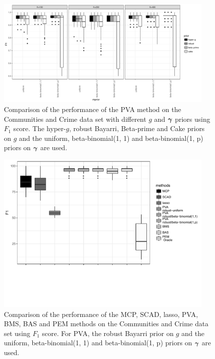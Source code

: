\begin{figure}
	\begin{center}	
		\includegraphics[width=0.95\textwidth]{./commPVA_F1.pdf}  
	\end{center}
	\caption{Comparison of the performance of the PVA method on the
						Communities and Crime data set with different $g$ and ${\boldsymbol \gamma}$ priors using $F_1$ score.
						The hyper-$g$,
						robust Bayarri, Beta-prime and Cake priors on $g$ and the uniform, beta-binomial(1, 1) and beta-binomial(1, p) priors on ${\boldsymbol \gamma}$ are used.}
	\label{fig:commPVA_F1}
\end{figure}

\begin{figure}
	\begin{center}	
		\includegraphics[trim={0 4cm 0 0},width=0.95\textwidth]{./commPVA_F1_compare_edit.pdf}  
	\end{center}
	\caption{Comparison of the performance of the MCP, SCAD, lasso, PVA, BMS, BAS and PEM methods on the
						Communities and Crime data set using $F_1$ score. For PVA, the
						robust Bayarri prior on $g$ and the uniform, beta-binomial(1, 1) and beta-binomial(1, p) priors
						on ${\boldsymbol \gamma}$ are used.}
	\label{fig:commPVA_F1_compare}
\end{figure}

